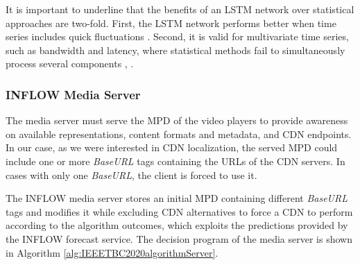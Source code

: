 It is important to underline that the benefits of an LSTM network over statistical approaches are two-fold. First, the LSTM network performs better when time series includes quick fluctuations \cite{wang2017}. Second, it is valid for multivariate time series, such as bandwidth and latency, where statistical methods fail to simultaneously process several components \cite{azari2019}, \cite{azari2019-2}.

\subsubsection{INFLOW Media Server}
\label{sec:mediaserver}

The media server must serve the MPD of the video players to provide awareness on available representations, content formats and metadata, and CDN endpoints. In our case, as we were interested in CDN localization, the served MPD could include one or more \textit{BaseURL} tags containing the URLs of the CDN servers. In cases with only one \textit{BaseURL}, the client is forced to use it.

The INFLOW media server stores an initial MPD containing different \textit{BaseURL} tags and modifies it while excluding CDN alternatives to force a CDN to perform according to the algorithm outcomes, which exploits the predictions provided by the INFLOW forecast service. The decision program of the media server is shown in Algorithm \ref{alg:IEEETBC2020algorithmServer}.

